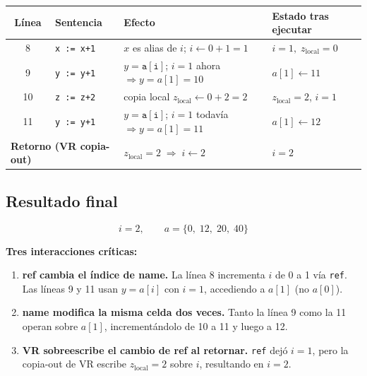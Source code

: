 \documentclass[11pt]{article}
\begin{document}
\begin{center}
\renewcommand{\arraystretch}{1.4}
\begin{tabular}{clll}
  \toprule
  Línea & Sentencia & Efecto & Estado tras ejecutar \\
  \midrule
  8 & \texttt{x := x+1} &
      $x$ es alias de $i$; $i \leftarrow 0{+}1 = 1$ &
      $i=1,\; z_{\text{local}}=0$ \\
  9 & \texttt{y := y+1} &
      $y = \mathtt{a[i]}$; $i=1$ ahora $\Rightarrow y = a[1] = 10$ &
      $a[1] \leftarrow 11$ \\
  10 & \texttt{z := z+2} &
      copia local $z_{\text{local}} \leftarrow 0{+}2 = 2$ &
      $z_{\text{local}}=2$, $i=1$ \\
  11 & \texttt{y := y+1} &
      $y = \mathtt{a[i]}$; $i=1$ todavía $\Rightarrow y = a[1] = 11$ &
      $a[1] \leftarrow 12$ \\
  \midrule
  \multicolumn{2}{l}{\textbf{Retorno (VR copia-out)}} &
      $z_{\text{local}} = 2 \;\Rightarrow\; i \leftarrow 2$ &
      $i = 2$ \\
  \bottomrule
\end{tabular}
\end{center}

\subsection*{Resultado final}


\[
  \boxed{i = 2, \qquad a = \{0,\; 12,\; 20,\; 40\}}
\]

\begin{tcolorbox}
  \textbf{Tres interacciones críticas:}
  \begin{enumerate}
    \item \textbf{ref cambia el índice de name.}
          La línea 8 incrementa $i$ de 0 a 1 vía \texttt{ref}.
          Las líneas 9 y 11 usan $y = a[i]$ con $i=1$, accediendo a
          $a[1]$ (no $a[0]$).
    \item \textbf{name modifica la misma celda dos veces.}
          Tanto la línea 9 como la 11 operan sobre $a[1]$,
          incrementándolo de 10 a 11 y luego a 12.
    \item \textbf{VR sobreescribe el cambio de ref al retornar.}
          \texttt{ref} dejó $i=1$, pero la copia-out de VR escribe
          $z_{\text{local}}=2$ sobre $i$, resultando en $i=2$.
  \end{enumerate}
\end{tcolorbox}
\end{document}
